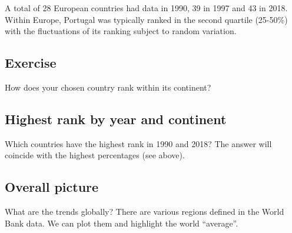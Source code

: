 \documentclass[a4paper,9pt,twocolumn,twoside,printwatermark=true]{pinp}
\begin{document}
A total of 28 European countries had data in 1990, 39 in 1997 and 43 in
2018. Within Europe, Portugal was typically ranked in the second
quartile (25-50\%) with the fluctuations of its ranking subject to
random variation.

\subsection{Exercise}\label{exercise-6}

How does your chosen country rank within its continent?

\subsection{Highest rank by year and
continent}\label{highest-rank-by-year-and-continent}

Which countries have the highest rank in 1990 and 2018? The answer will
coincide with the highest percentages (see above).

\begin{Shaded}
\end{Shaded}

\subsection{Overall picture}\label{overall-picture}

What are the trends globally? There are various regions defined in the
World Bank data. We can plot them and highlight the world ``average''.
\end{document}
